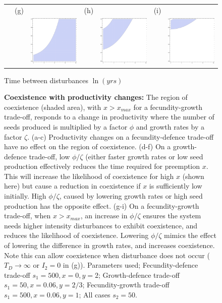 \documentclass[a4paper]{article}
\begin{document}
\begin{figure}[th]
\begin{tabular}{lcccccc}
 &(g)&&(h)&&(i)&\\
 && \includegraphics[width=1.5in]{fgphizeta1over3.pdf} && \includegraphics[width=1.5in]{fgphizeta1.pdf} && \includegraphics[width=1.5in]{fgphizeta3.pdf} \\
 \end{tabular}
 Time between disturbances $\ln(yrs)$
   \caption{\textbf{Coexistence with productivity changes: }The region of coexistence (shaded area), with $x>x_{max}$ for a fecundity-growth trade-off, responds to a change in productivity where the number of seeds produced is multiplied by a factor $\phi$ and growth rates by a factor $\zeta$. (a-c) Productivity changes on a fecundity-defence trade-off have no effect on the region of coexistence. (d-f) On a growth-defence trade-off, low $\phi/\zeta$ (either faster growth rates or low seed production effectively reduces the time required for preemption $x$. This will increase the likelihood of coexistence for high $x$ (shown here) but cause a reduction in coexistence if $x$ is sufficiently low initially. High $\phi/\zeta$, caused by lowering growth rates or high seed production has the opposite effect. (g-i) On a fecundity-growth trade-off, when $x>x_{max}$, an increase in $\phi/\zeta$ ensures the system needs higher intensity disturbances to exhibit coexistence, and reduces the likelihood of coexistence. Lowering $\phi/\zeta$ mimics the effect of lowering the difference in growth rates, and increases coexistence. Note this can allow coexistence when disturbance does not occur ($T_D \to \infty$ or $I_2=0$ in (g)). Parameters used; Fecundity-defence trade-off $s_1=500,x=0,y=2$; Growth-defence trade-off $s_1=50,x=0.06,y=2/3$; Fecundity-growth trade-off $s_1=500,x=0.06,y=1$; All cases $s_2=50$.}
 \label{fig:FvIwithprod}
 \end{figure}
\end{document}
